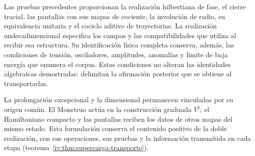 Las pruebas precedentes proporcionan la realización
hilbertiana de fase, el cierre tracial, las pantallas
con sus mapas de cociente, la involución de radio,
su equivalencia unitaria y el cociclo aditivo de
trayectorias. La realización undecadimensional
especifica los campos y las compatibilidades que
utiliza al recibir esa estructura. Su identificación
física completa conserva, además, las condiciones
de tensión, osciladores, amplitudes, anomalías y
límite de baja energía que enumera el corpus.
Estas condiciones no alteran las identidades
algebraicas demostradas: delimitan la afirmación
posterior que se obtiene al transportarlas.

La prolongación excepcional y la dimensional
permanecen vinculadas por su origen común. El
Monstruo actúa en la construcción graduada
\(V^\natural\); el Hamiltoniano compacto y las
pantallas reciben los datos de otros mapas del
mismo estado. Esta formulación conserva el
contenido positivo de la doble realización,
con sus operaciones, sus pruebas y la información
transmitida en cada etapa (teorema~\ref{iv:thm:supercarga-transporte}).
